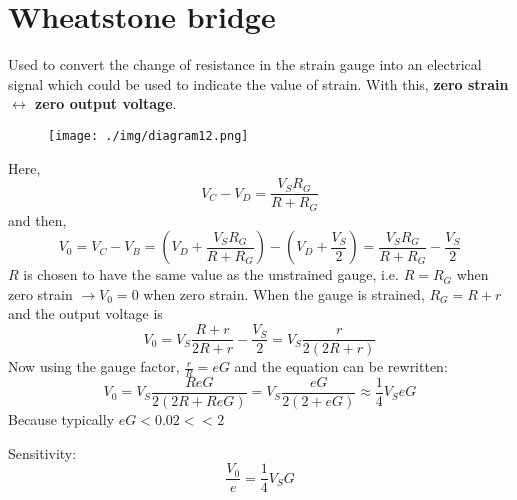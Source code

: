 \section{Wheatstone bridge}
Used to convert the change of resistance in the strain gauge into an electrical signal which could be used to indicate the value of strain. With this, \textbf{zero strain $\leftrightarrow$ zero output voltage}.
\begin{figure}[H]
  \centering
  \texttt{[image: ./img/diagram12.png]}
\end{figure}
Here,
\begin{equation}
  V_C - V_D = \frac{V_S R_G}{R + R_G}
\end{equation}
and then,
\begin{equation}
  V_0 = V_C - V_B = \left( V_D + \frac{V_S R_G}{R + R_G} \right) - \left( V_D + \frac{V_S}{2} \right) = \frac{V_S R_G}{R + R_G} - \frac{V_S}{2}
\end{equation}
$R$ is chosen to have the same value as the unstrained gauge, i.e. $R = R_G$ when zero strain $\rightarrow V_0 = 0$ when zero strain. When the gauge is strained, $R_G = R + r$ and the output voltage is
\begin{equation}
  V_0 = V_S \frac{R + r}{2R + r} - \frac{V_S}{2} = V_S \frac{r}{2(2R +r)}
\end{equation}
Now using the gauge factor, $\frac{r}{R} = eG$ and the equation can be rewritten:
\begin{equation}
  V_0 = V_S \frac{ReG}{2(2R + ReG)} = V_S\frac{eG}{2(2+eG)} \approx \frac{1}{4} V_S eG
\end{equation}
Because typically $eG < 0.02 << 2$

Sensitivity:
\begin{equation}
  \frac{V_0}{e} = \frac{1}{4} V_S G
\end{equation}
